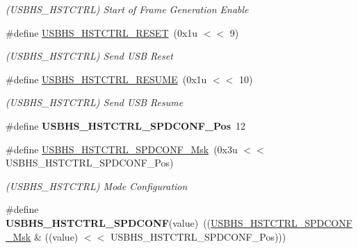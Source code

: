 \begin{DoxyCompactItemize}
\begin{DoxyCompactList}\small\item\em (U\+S\+B\+H\+S\+\_\+\+H\+S\+T\+C\+T\+RL) Start of Frame Generation Enable \end{DoxyCompactList}\item 
\mbox{\label{group__SAMS70__USBHS_gaf14d017526803c9e24ead6001d3aa65e}} 
\#define \mbox{\hyperlink{group__SAMS70__USBHS_gaf14d017526803c9e24ead6001d3aa65e}{U\+S\+B\+H\+S\+\_\+\+H\+S\+T\+C\+T\+R\+L\+\_\+\+R\+E\+S\+ET}}~(0x1u $<$$<$ 9)
\begin{DoxyCompactList}\small\item\em (U\+S\+B\+H\+S\+\_\+\+H\+S\+T\+C\+T\+RL) Send U\+SB Reset \end{DoxyCompactList}\item 
\mbox{\label{group__SAMS70__USBHS_ga5c41b3b0eb74877bcc83503849a3833b}} 
\#define \mbox{\hyperlink{group__SAMS70__USBHS_ga5c41b3b0eb74877bcc83503849a3833b}{U\+S\+B\+H\+S\+\_\+\+H\+S\+T\+C\+T\+R\+L\+\_\+\+R\+E\+S\+U\+ME}}~(0x1u $<$$<$ 10)
\begin{DoxyCompactList}\small\item\em (U\+S\+B\+H\+S\+\_\+\+H\+S\+T\+C\+T\+RL) Send U\+SB Resume \end{DoxyCompactList}\item 
\mbox{\label{group__SAMS70__USBHS_ga3dbc1f0e1a120ea37ac7e126e5048c18}} 
\#define {\bfseries U\+S\+B\+H\+S\+\_\+\+H\+S\+T\+C\+T\+R\+L\+\_\+\+S\+P\+D\+C\+O\+N\+F\+\_\+\+Pos}~12
\item 
\mbox{\label{group__SAMS70__USBHS_gac7ec7fd901405a233ec5fc86a4c8cf33}} 
\#define \mbox{\hyperlink{group__SAMS70__USBHS_gac7ec7fd901405a233ec5fc86a4c8cf33}{U\+S\+B\+H\+S\+\_\+\+H\+S\+T\+C\+T\+R\+L\+\_\+\+S\+P\+D\+C\+O\+N\+F\+\_\+\+Msk}}~(0x3u $<$$<$ U\+S\+B\+H\+S\+\_\+\+H\+S\+T\+C\+T\+R\+L\+\_\+\+S\+P\+D\+C\+O\+N\+F\+\_\+\+Pos)
\begin{DoxyCompactList}\small\item\em (U\+S\+B\+H\+S\+\_\+\+H\+S\+T\+C\+T\+RL) Mode Configuration \end{DoxyCompactList}\item 
\mbox{\label{group__SAMS70__USBHS_gafa93266fe4a5db3f21621b544b3fcbf0}} 
\#define {\bfseries U\+S\+B\+H\+S\+\_\+\+H\+S\+T\+C\+T\+R\+L\+\_\+\+S\+P\+D\+C\+O\+NF}(value)~((\mbox{\hyperlink{group__SAMV71__USBHS_gac7ec7fd901405a233ec5fc86a4c8cf33}{U\+S\+B\+H\+S\+\_\+\+H\+S\+T\+C\+T\+R\+L\+\_\+\+S\+P\+D\+C\+O\+N\+F\+\_\+\+Msk}} \& ((value) $<$$<$ U\+S\+B\+H\+S\+\_\+\+H\+S\+T\+C\+T\+R\+L\+\_\+\+S\+P\+D\+C\+O\+N\+F\+\_\+\+Pos)))

\end{DoxyCompactItemize}
